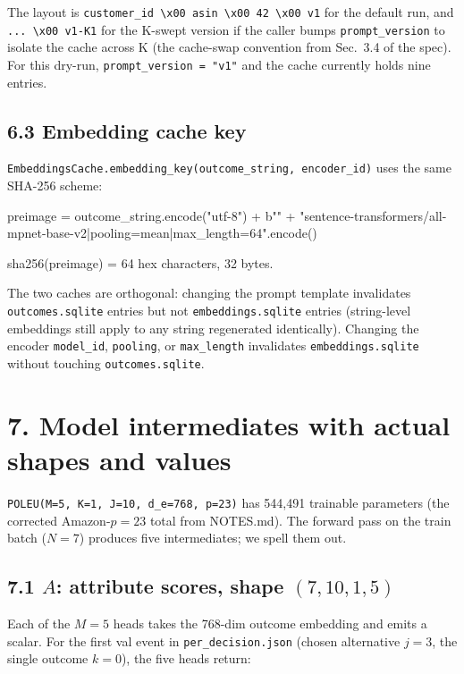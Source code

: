 \documentclass[11pt,a4paper]{article}
\begin{document}
The layout is
\texttt{customer\_id \textbackslash x00 asin \textbackslash x00 42 \textbackslash x00 v1}
for the default run, and
\texttt{... \textbackslash x00 v1-K1} for the K-swept version if the
caller bumps \texttt{prompt\_version} to isolate the cache across K
(the cache-swap convention from Sec.~3.4 of the spec). For this
dry-run, \texttt{prompt\_version = "v1"} and the cache currently holds
nine entries.

\subsection*{6.3 Embedding cache key}

\texttt{EmbeddingsCache.embedding\_key(outcome\_string, encoder\_id)}
uses the same SHA-256 scheme:

\begin{code}
preimage = outcome_string.encode("utf-8")
         + b""
         + "sentence-transformers/all-mpnet-base-v2|pooling=mean|max_length=64".encode()

sha256(preimage) = 64 hex characters, 32 bytes.
\end{code}

The two caches are orthogonal: changing the prompt template
invalidates \texttt{outcomes.sqlite} entries but not
\texttt{embeddings.sqlite} entries (string-level embeddings still
apply to any string regenerated identically). Changing the encoder
\texttt{model\_id}, \texttt{pooling}, or \texttt{max\_length}
invalidates \texttt{embeddings.sqlite} without touching
\texttt{outcomes.sqlite}.

\section*{7. Model intermediates with actual shapes and values}

\texttt{POLEU(M=5, K=1, J=10, d\_e=768, p=23)} has 544{,}491 trainable
parameters (the corrected Amazon-$p = 23$ total from NOTES.md). The
forward pass on the train batch ($N = 7$) produces five intermediates;
we spell them out.

\subsection*{7.1 $A$: attribute scores, shape $(7, 10, 1, 5)$}

Each of the $M = 5$ heads takes the 768-dim outcome embedding and
emits a scalar. For the first val event in
\texttt{per\_decision.json} (chosen alternative $j = 3$, the single
outcome $k = 0$), the five heads return:
\end{document}

